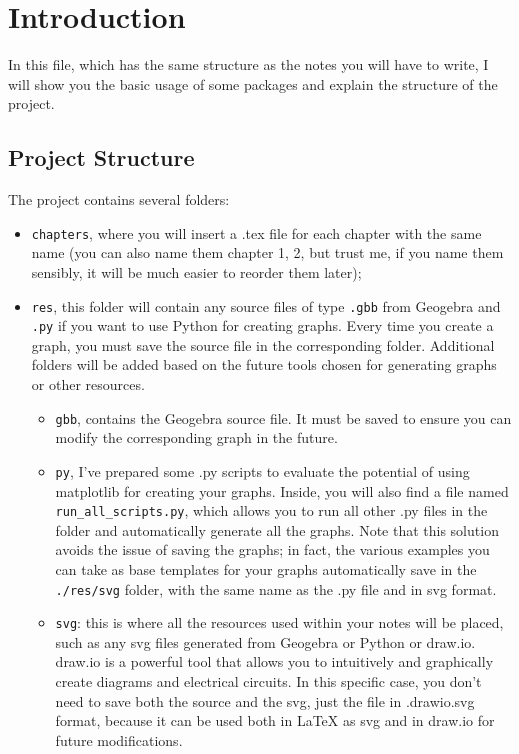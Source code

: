 \chapter{Introduction}

In this file, which has the same structure as the notes you will have to write, I will show you the basic usage of some packages and explain the structure of the project.

\section{Project Structure}

The project contains several folders:
\begin{itemize}
    \item \texttt{chapters}, where you will insert a .tex file for each chapter with the same name (you can also name them chapter 1, 2, but trust me, if you name them sensibly, it will be much easier to reorder them later);
    \item \texttt{res}, this folder will contain any source files of type \texttt{.gbb} from Geogebra and \texttt{.py} if you want to use Python for creating graphs. Every time you create a graph, you must save the source file in the corresponding folder. Additional folders will be added based on the future tools chosen for generating graphs or other resources.
    \begin{itemize}
        \item \texttt{gbb}, contains the Geogebra source file. It must be saved to ensure you can modify the corresponding graph in the future.
        \item \texttt{py}, I've prepared some .py scripts to evaluate the potential of using matplotlib for creating your graphs. Inside, you will also find a file named \texttt{run\_all\_scripts.py}, which allows you to run all other .py files in the folder and automatically generate all the graphs. Note that this solution avoids the issue of saving the graphs; in fact, the various examples you can take as base templates for your graphs automatically save in the \texttt{./res/svg} folder, with the same name as the .py file and in svg format.
        \item \texttt{svg}: this is where all the resources used within your notes will be placed, such as any svg files generated from Geogebra or Python or draw.io. draw.io is a powerful tool that allows you to intuitively and graphically create diagrams and electrical circuits. In this specific case, you don't need to save both the source and the svg, just the file in .drawio.svg format, because it can be used both in LaTeX as svg and in draw.io for future modifications.

\end{itemize}
\end{itemize}
